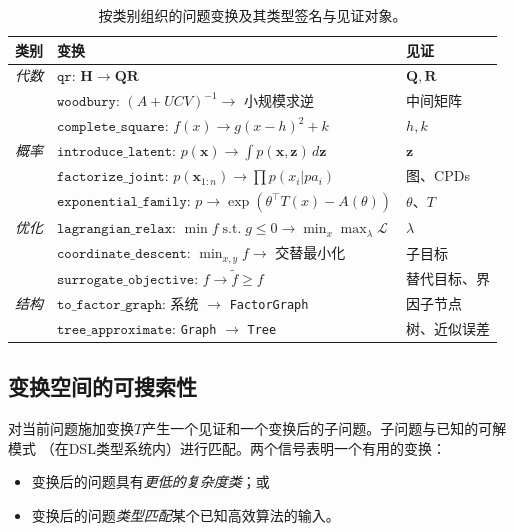 \documentclass[12pt,a4paper]{article}
\newcommand{\bH}{\mathbf{H}}
\newcommand{\bx}{\mathbf{x}}
\begin{document}
\begin{table}[H]
  \centering
  \caption{按类别组织的问题变换及其类型签名与见证对象。}
  \label{tab:transforms}
  \small
  \begin{tabular}{@{}p{2.6cm}p{7.8cm}p{2.6cm}@{}}
    \toprule
    \textbf{类别} & \textbf{变换} & \textbf{见证} \\
    \midrule
    \textit{代数} &
      $\mathtt{qr}$: $\bH \to \mathbf{Q}\mathbf{R}$ & $\mathbf{Q},\mathbf{R}$ \\
    &  $\mathtt{woodbury}$: $(A+UCV)^{-1}\to$ 小规模求逆 & 中间矩阵 \\
    &  $\mathtt{complete\_square}$: $f(x)\to g(x-h)^2+k$ & $h,k$ \\
    \midrule
    \textit{概率} &
      $\mathtt{introduce\_latent}$: $p(\bx)\to\int p(\bx,\mathbf{z})\,d\mathbf{z}$ & $\mathbf{z}$ \\
    &  $\mathtt{factorize\_joint}$: $p(\bx_{1:n})\to\prod p(x_i|pa_i)$ & 图、CPDs \\
    &  $\mathtt{exponential\_family}$: $p\to\exp(\theta^\top T(x)-A(\theta))$ & $\theta$、$T$ \\
    \midrule
    \textit{优化} &
      $\mathtt{lagrangian\_relax}$: $\min f\;\mathrm{s.t.}\; g\le 0 \to \min_x\max_\lambda\mathcal{L}$ & $\lambda$ \\
    &  $\mathtt{coordinate\_descent}$: $\min_{x,y}f\to$ 交替最小化 & 子目标 \\
    &  $\mathtt{surrogate\_objective}$: $f\to\tilde{f}\ge f$ & 替代目标、界 \\
    \midrule
    \textit{结构} &
      $\mathtt{to\_factor\_graph}$: 系统 $\to$ \texttt{FactorGraph} & 因子节点 \\
    &  $\mathtt{tree\_approximate}$: \texttt{Graph} $\to$ \texttt{Tree} & 树、近似误差 \\
    \bottomrule
  \end{tabular}
\end{table}

\subsection{变换空间的可搜索性}

对当前问题施加变换$T$产生一个见证和一个变换后的子问题。子问题与已知的可解模式
（在DSL类型系统内）进行匹配。两个信号表明一个有用的变换：
\begin{itemize}[itemsep=0pt]
  \item 变换后的问题具有\emph{更低的复杂度类}；或
  \item 变换后的问题\emph{类型匹配}某个已知高效算法的输入。
\end{itemize}
\end{document}
